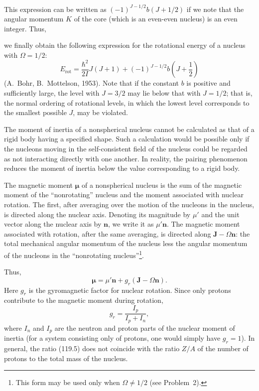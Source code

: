 This expression can be written as $(-1)^{J-1/2}b(J+1/2)$ if we note that the angular momentum $K$ of the core (which is an even-even nucleus) is an even integer. Thus,

we finally obtain the following expression for the rotational energy of a nucleus with $\Omega=1/2$:
\begin{equation}
 E_{\mathrm{rot}}=\frac{\hbar^2}{2I}J(J+1)
 +(-1)^{J-1/2}b\left(J+\frac12\right)
 \tag{119.3}
\end{equation}
(A.~Bohr, B.~Mottelson, 1953). Note that if the constant $b$ is positive and sufficiently large, the level with $J=3/2$ may lie below that with $J=1/2$; that is, the normal ordering of rotational levels, in which the lowest level corresponds to the smallest possible $J$, may be violated.

The moment of inertia of a nonspherical nucleus cannot be calculated as that of a rigid body having a specified shape. Such a calculation would be possible only if the nucleons moving in the self-consistent field of the nucleus could be regarded as not interacting directly with one another. In reality, the pairing phenomenon reduces the moment of inertia below the value corresponding to a rigid body.

The magnetic moment $\boldsymbol\mu$ of a nonspherical nucleus is the sum of the magnetic moment of the ``nonrotating'' nucleus and the moment associated with nuclear rotation. The first, after averaging over the motion of the nucleons in the nucleus, is directed along the nuclear axis. Denoting its magnitude by $\mu'$ and the unit vector along the nuclear axis by $\mathbf n$, we write it as $\mu'\mathbf n$. The magnetic moment associated with rotation, after the same averaging, is directed along $\mathbf J-\Omega\mathbf n$: the total mechanical angular momentum of the nucleus less the angular momentum of the nucleons in the ``nonrotating nucleus''\footnote{This form may be used only when $\Omega\ne1/2$ (see Problem~2).}.

Thus,
\begin{equation}
 \boldsymbol\mu=\mu'\mathbf n+g_r(\mathbf J-\Omega\mathbf n).
 \tag{119.4}
\end{equation}
Here $g_r$ is the gyromagnetic factor for nuclear rotation. Since only protons contribute to the magnetic moment during rotation,
\begin{equation}
 g_r=\frac{I_p}{I_p+I_n},
 \tag{119.5}
\end{equation}
where $I_n$ and $I_p$ are the neutron and proton parts of the nuclear moment of inertia (for a system consisting only of protons, one would simply have $g_r=1$). In general, the ratio (119.5) does not coincide with the ratio $Z/A$ of the number of protons to the total mass of the nucleus.

